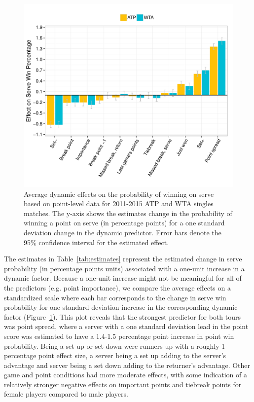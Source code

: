 \documentclass{Latex/svjour3}
\begin{document}
\begin{figure}
\includegraphics[scale=0.8]{figs/avg_effects.pdf}
\caption{Average dynamic effects on the probability of winning on serve based on
  point-level data for 2011-2015 ATP and WTA singles matches. The y-axis shows
  the estimates change in the probability of winning a point on serve (in
  percentage points) for a one standard deviation change in the dynamic
  predictor. Error bars denote the 95\% confidence interval for the estimated
  effect.}
\label{fig:1}
\end{figure}

The estimates in Table~\ref{tab:estimates} represent the estimated change in
serve probability (in percentage points units) associated with a one-unit
increase in a dynamic factor. Because a one-unit increase might not be
meaningful for all of the predictors (e.g. point importance), we compare the
average effects on a standardized scale where each bar corresponds to the change
in serve win probability for one standard deviation increase in the
corresponding dynamic factor (Figure~\ref{fig:1}). This plot reveals that the
strongest predictor for both tours was point spread, where a server with a one
standard deviation lead in the point score was estimated to have a 1.4-1.5
percentage point increase in point win probability. Being a set up or set down
were runners up with a roughly 1 percentage point effect size, a server being a
set up adding to the server's advantage and server being a set down adding to
the returner's advantage. Other game and point conditions had more moderate
effects, with some indication of a relatively stronger negative effects on
important points and tiebreak points for female players compared to male
players.
\end{document}
